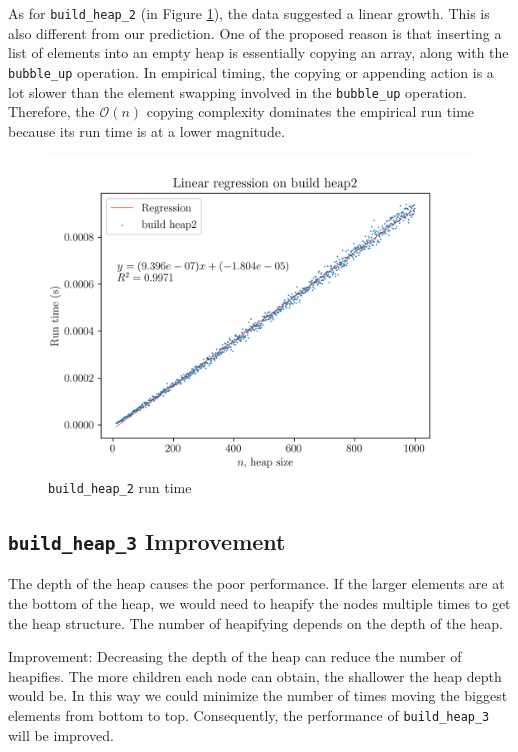 \documentclass[titlepage, 12pt]{article}
\begin{document}
As for \texttt{build\_heap\_2} (in Figure \ref{fig:build2}), the data suggested
a linear growth. This is also different from our prediction. One of the proposed
reason is that inserting a list of elements into an empty heap is essentially
copying an array, along with the \texttt{bubble\_up} operation. In empirical
timing, the copying or appending action is a lot slower than the element
swapping involved in the \texttt{bubble\_up} operation. Therefore, the
\(\mathcal{O}(n)\) copying complexity dominates the empirical run time because
its run time is at a lower magnitude.
\begin{figure}[h]
  \centering
  \includegraphics[width=\linewidth]{build2} 
  \caption{\texttt{build\_heap\_2} run time}
  \label{fig:build2}
\end{figure}

\subsection{\texttt{build\_heap\_3} Improvement}
\label{sec:inprove}

The depth of the heap causes the poor performance. If the larger elements are at
the bottom of the heap, we would need to heapify the nodes multiple times to get
the heap structure. The number of heapifying depends on the depth of the heap.

Improvement: Decreasing the depth of the heap can reduce the number of
heapifies. The more children each node can obtain, the shallower the heap depth
would be. In this way we could minimize the number of times moving the biggest
elements from bottom to top. Consequently, the performance of
\texttt{build\_heap\_3} will be improved.
\end{document}
